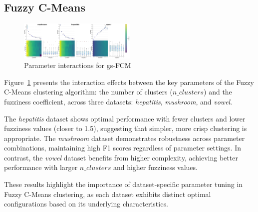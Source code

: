 \subsection{Fuzzy C-Means}
\label{subsec:fuzzycmeansresults}

\begin{figure}[ht!]
    \includegraphics[width=0.5\textwidth]{figures/interactions_fuzzy_cmeans.png}
    \caption{Parameter interactions for gs-FCM}
    \label{fig:interactions_gsfcm}
\end{figure}


Figure~\ref{fig:interactions_gsfcm} presents the interaction effects between the key parameters of the Fuzzy C-Means clustering algorithm: the number of clusters ($n\_clusters$) and the fuzziness coefficient, across three datasets: \textit{hepatitis}, \textit{mushroom}, and \textit{vowel}.

The \textit{hepatitis} dataset shows optimal performance with fewer clusters and lower fuzziness values (closer to 1.5), suggesting that simpler, more crisp clustering is appropriate. The \textit{mushroom} dataset demonstrates robustness across parameter combinations, maintaining high F1 scores regardless of parameter settings. In contrast, the \textit{vowel} dataset benefits from higher complexity, achieving better performance with larger $n\_clusters$ and higher fuzziness values.

These results highlight the importance of dataset-specific parameter tuning in Fuzzy C-Means clustering, as each dataset exhibits distinct optimal configurations based on its underlying characteristics.

